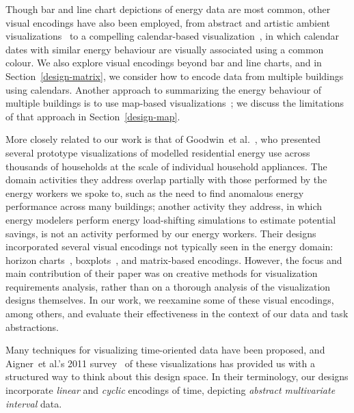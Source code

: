 \documentclass[journal]{vgtc}                %
\newcommand{\bstart}[1]{\vspace{1mm} \noindent{\textbf{#1:}}}
\newcommand{\etal}{et al.}
\begin{document}
Though bar and line chart depictions of energy data are most common, other visual encodings have also been employed, from abstract and artistic ambient visualizations~\cite{Rodgers2011} to a compelling calendar-based visualization~\cite{vanWijk1999}, in which calendar dates with similar energy behaviour are visually associated using a common colour.
We also explore visual encodings beyond bar and line charts, and in Section~\ref{design-matrix}, we consider how to encode data from multiple buildings using calendars.
Another approach to summarizing the energy behaviour of multiple buildings is to use map-based visualizations~\cite{Heat2014,MEP2014}; we discuss the limitations of that approach in Section~\ref{design-map}. 

More closely related to our work is that of Goodwin~\etal~\cite{Goodwin2013}, who presented several prototype visualizations of modelled residential energy use across thousands of households at the scale of individual household appliances. 
The domain activities they address overlap partially with those performed by the energy workers we spoke to, such as the need to find anomalous energy performance across many buildings; another activity they address, in which energy modelers perform energy load-shifting simulations to estimate potential savings, is not an activity performed by our energy workers. 
Their designs incorporated several visual encodings not typically seen in the energy domain: horizon charts~\cite{Heer2009}, boxplots~\cite{Wickham2011}, and matrix-based encodings.
However, the focus and main contribution of their paper was on creative methods for visualization requirements analysis, rather than on a thorough analysis of the visualization designs themselves.
In our work, we reexamine some of these visual encodings, among others, and evaluate their effectiveness in the context of our data and task abstractions. 

\bstart{Visualizing multiple time series} Many techniques for visualizing time-oriented data have been proposed, and Aigner~\etal's 2011 survey~\cite{Aigner2011} of these visualizations has provided us with a structured way to think about this design space.
In their terminology, our designs incorporate {\it linear} and {\it cyclic} encodings of time, depicting {\it abstract multivariate interval} data.
\end{document}
